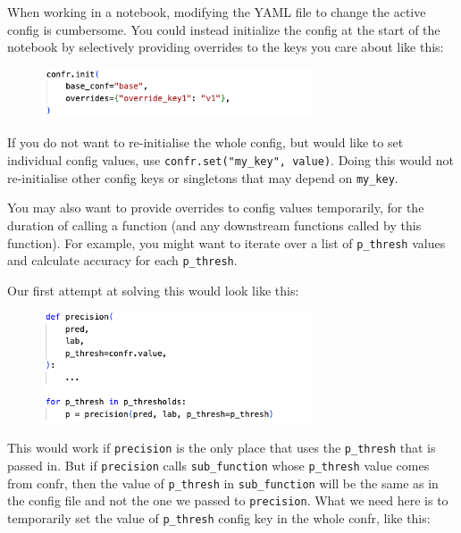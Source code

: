 \documentclass{itatnew}
\begin{document}
When working in a notebook, modifying the YAML file to change the active config is cumbersome.
You could instead initialize the config at the start of the notebook by selectively providing overrides to the keys you care about like this:

\begin{figure}[H]
    \centering
    \includegraphics[width=8cm]{c9.png}
\end{figure}

If you do not want to re-initialise the whole config, but would like to set individual config values, use \texttt{confr.set("my_key", value)}. Doing this would not re-initialise other config keys or singletons that may depend on \texttt{my_key}.

You may also want to provide overrides to config values temporarily, for the duration of calling a function (and any downstream functions called by this function). For example, you might want to iterate over a list of \texttt{p_thresh} values and calculate accuracy for each \texttt{p_thresh}.

Our first attempt at solving this would look like this:

\begin{figure}[H]
    \centering
    \includegraphics[width=8cm]{c10.png}
\end{figure}

This would work if \texttt{precision} is the only place that uses the \texttt{p_thresh} that is passed in. But if \texttt{precision} calls \texttt{sub_function} whose \texttt{p_thresh} value comes from confr, then the value of \texttt{p_thresh} in \texttt{sub_function} will be the same as in the config file and not the one we passed to \texttt{precision}. What we need here is to temporarily set the value of \texttt{p_thresh} config key in the whole confr, like this:
\end{document}
